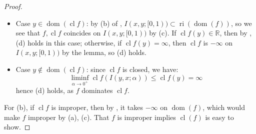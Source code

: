 \begin{proof}
	\begin{itemize}
		\item Case $y\in \operatorname{dom}(\operatorname{cl}f)$: by (b) of , $I(x,y;[0, 1))\subset \operatorname{ri}(\operatorname{dom}(f))$, so we see that $f,\operatorname{cl}f$ coincides on $I(x,y;[0,1))$ by (c). If $\operatorname{cl}f(y)\in \mathbb{R}$, then by , (d) holds in this case; otherwise, if $\operatorname{cl}f(y)=\infty$, then $\operatorname{cl}f$ is $-\infty$ on $I(x,y;[0,1))$ by the lemma, so (d) holds.
		\item Case $y\notin \operatorname{dom}(\operatorname{cl}f)$: since $\operatorname{cl}f$ is closed, we have:
		      \[
			      \underset{\alpha \to 0^+}{\operatorname{liminf}}\operatorname{cl}f(I(y,x;\alpha ))\leq \operatorname{cl}f(y)=\infty
		      \]
		      hence (d) holds, as $f$ dominates $\operatorname{cl}f$.
	\end{itemize}
	For (b), if $\operatorname{cl}f$ is improper, then by , it takes $-\infty$ on $\operatorname{dom}(f)$, which would make $f$ improper by (a), (c). That $f$ is improper implies $\operatorname{cl}(f)$ is easy to show.
\end{proof}

